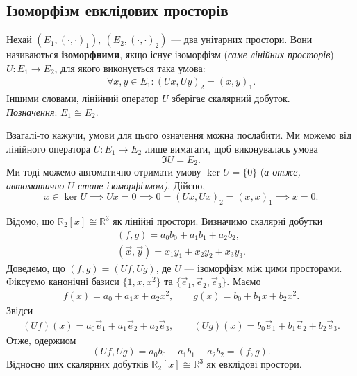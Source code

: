 \documentclass{math_library}
\begin{document}
\subsection{Ізоморфізм евклідових просторів}
\begin{definition}
Нехай $(E_1,(\cdot,\cdot)_1),\ (E_2,(\cdot,\cdot)_2)$ --- два унітарних простори. Вони називаються \textbf{ізоморфними}, якщо існує ізоморфізм (\textit{саме лінійних просторів}) $U \colon E_1 \to E_2$, для якого виконується така умова:
\begin{align*}
\forall x,y \in E_1: (Ux,Uy)_2 = (x,y)_1.
\end{align*}
Іншими словами, лінійний оператор $U$ зберігає скалярний добуток.\\
\textit{Позначення}: $E_1 \cong E_2$.
\end{definition}

\begin{remark}
Взагалі-то кажучи, умови для цього означення можна послабити. Ми можемо від лінійного оператора $U \colon E_1 \to E_2$ лише вимагати, щоб виконувалась умова
\[
\Im U = E_2.
\]
Ми тоді можемо автоматично отримати умову $\ker U = \{0\}$ (\textit{а отже, автоматично $U$ стане ізоморфізмом)}. Дійсно,
\[
x \in \ker U \implies Ux = 0 \implies 0 = (Ux,Ux)_2 = (x,x)_1 \implies x = 0.
\]
\end{remark}

\begin{example}
Відомо, що $\mathbb{R}_{2}[x] \cong \mathbb{R}^3$ як лінійні простори. Визначимо скалярні добутки
\begin{align*}
(f,g) = a_0b_0 + a_1b_1 + a_{2}b_{2}, \\
(\vec{x},\vec{y}) = x_1y_1 + x_2y_2 + x_3y_3.
\end{align*}
Доведемо, що $(f,g) = (Uf,Ug)$, де $U$ --- ізоморфізм між цими просторами.
\bigskip \\
Фіксуємо канонічні базиси $\{1,x,x^2\}$ та $\{\vec{e}_1,\vec{e}_2,\vec{e}_3\}$. Маємо
\begin{align*}
f(x) = a_0 + a_1 x + a_2 x^2, \qquad g(x) = b_0 + b_1 x + b_2 x^2.
\end{align*}
Звідси
\begin{align*}
(Uf)(x) = a_0 \vec{e}_1 + a_1 \vec{e}_2 + a_2 \vec{e}_3, \qquad (Ug)(x) = b_0 \vec{e}_1 + b_1 \vec{e}_2 + b_2 \vec{e}_3.
\end{align*}
Отже, одержиом
\[
(Uf,Ug) = a_0b_0 + a_1b_1 + a_2b_2 = (f,g).
\]
Відносно цих скалярних добутків $\mathbb{R}_{2}[x] \cong \mathbb{R}^3$ як евклідові простори.
\end{example}
\end{document}
